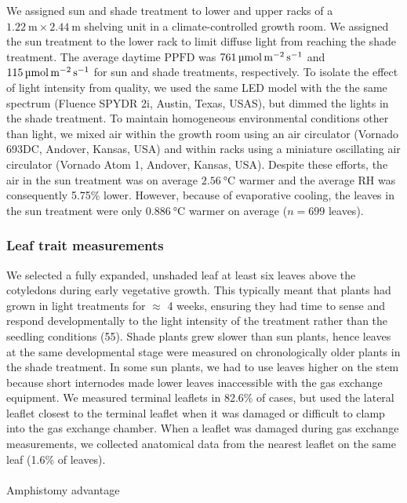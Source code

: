 \documentclass[
  letterpaper,
  DIV=11,
  numbers=noendperiod]{scrartcl}
\makeatletter
\let\oldparagraph\paragraph
\renewcommand{\paragraph}{
    \@ifstar
      \xxxParagraphStar
      \xxxParagraphNoStar
  }
\newcommand{\xxxParagraphStar}[1]{\oldparagraph*{#1}\mbox{}}
\newcommand{\xxxParagraphNoStar}[1]{\oldparagraph{#1}\mbox{}}
\newcommand{\ppfd}{$\mathrm{PPFD}$}
\newcommand{\ppfdqty}[1]{$\qty{#1}{\micro\mol\raiseto{-2}\meter\raiseto{-1}\second}$}
\makeatother
\begin{document}
We assigned sun and shade treatment to lower and upper racks of a
\(\qty{1.22}{\meter} \times \qty{2.44}{\meter}\) shelving unit in a
climate-controlled growth room. We assigned the sun treatment to the
lower rack to limit diffuse light from reaching the shade treatment. The
average daytime \ppfd{} was \ppfdqty{761} and \ppfdqty{115} for sun and
shade treatments, respectively. To isolate the effect of light intensity
from quality, we used the same LED model with the the same spectrum
(Fluence SPYDR 2i, Austin, Texas, USAS), but dimmed the lights in the
shade treatment. To maintain homogeneous environmental conditions other
than light, we mixed air within the growth room using an air circulator
(Vornado 693DC, Andover, Kansas, USA) and within racks using a miniature
oscillating air circulator (Vornado Atom 1, Andover, Kansas, USA).
Despite these efforts, the air in the sun treatment was on average
\(\qty{2.56}{\degreeCelsius}\) warmer and the average RH was
consequently 5.75\% lower. However, because of evaporative cooling, the
leaves in the sun treatment were only \(\qty{0.886}{\degreeCelsius}\)
warmer on average (\(n = 699\) leaves).

\subsubsection{Leaf trait measurements}\label{leaf-trait-measurements}

We selected a fully expanded, unshaded leaf at least six leaves above
the cotyledons during early vegetative growth. This typically meant that
plants had grown in light treatments for \(\approx\) 4 weeks, ensuring
they had time to sense and respond developmentally to the light
intensity of the treatment rather than the seedling conditions (55).
Shade plants grew slower than sun plants, hence leaves at the same
developmental stage were measured on chronologically older plants in the
shade treatment. In some sun plants, we had to use leaves higher on the
stem because short internodes made lower leaves inaccessible with the
gas exchange equipment. We measured terminal leaflets in 82.6\% of
cases, but used the lateral leaflet closest to the terminal leaflet when
it was damaged or difficult to clamp into the gas exchange chamber. When
a leaflet was damaged during gas exchange measurements, we collected
anatomical data from the nearest leaflet on the same leaf (1.6\% of
leaves).

\paragraph{Amphistomy advantage}\label{amphistomy-advantage}
\end{document}
